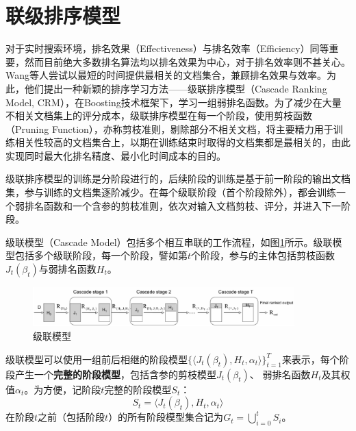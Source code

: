 \section{联级排序模型}
对于实时搜索环境，排名效果（Effectiveness）与排名效率（Efficiency）同等重要，然而目前绝大多数排名算法均以排名效果为中心，对于排名效率则不甚关心。Wang等人\cite{wang2010learning,wang2011cascade}尝试以最短的时间提供最相关的文档集合，兼顾排名效果与效率。为此，他们提出一种新颖的排序学习方法——级联排序模型（Cascade Ranking Model, CRM），在Boosting技术框架下，学习一组弱排名函数。为了减少在大量不相关文档集上的评分成本，级联排序模型在每一个阶段，使用剪枝函数（Pruning Function），亦称剪枝准则，剔除部分不相关文档，将主要精力用于训练相关性较高的文档集合上，以期在训练结束时取得的文档集都是最相关的，由此实现同时最大化排名精度、最小化时间成本的目的。

级联排序模型的训练是分阶段进行的，后续阶段的训练是基于前一阶段的输出文档集，参与训练的文档集逐阶减少。在每个级联阶段（首个阶段除外），都会训练一个弱排名函数和一个含参的剪枝准则，依次对输入文档剪枝、评分，并进入下一阶段。

级联模型（Cascade Model）包括多个相互串联的工作流程，如图\ref{fig:cascademodel}所示。级联模型包括多个级联阶段，每一个阶段，譬如第$t$个阶段，参与的主体包括剪枝函数$J_t(\beta_t)$与弱排名函数$H_t$。
\begin{figure}[htbp]
  \centering
  \includegraphics[width=0.9\textwidth]{figures/cascademodel.eps}
  \caption{级联模型}\label{fig:cascademodel}
\end{figure}

级联模型可以使用一组前后相继的阶段模型$\{\langle J_t(\beta_t), H_t, \alpha_t\rangle\}_{t=1}^T$来表示，每个阶段产生一个\textbf{完整的阶段模型}，包括含参的剪枝模型$J_t(\beta_t)$、 弱排名函数$H_t$及其权值$\alpha_t$。为方便，记阶段$t$完整的阶段模型$S_t$：
\begin{equation}
    S_t = \langle J_t(\beta_t), H_t, \alpha_t\rangle
\end{equation}
在阶段$t$之前（包括阶段$t$）的所有阶段模型集合记为$G_t = \bigcup\limits_{i=0}^t S_i$。

